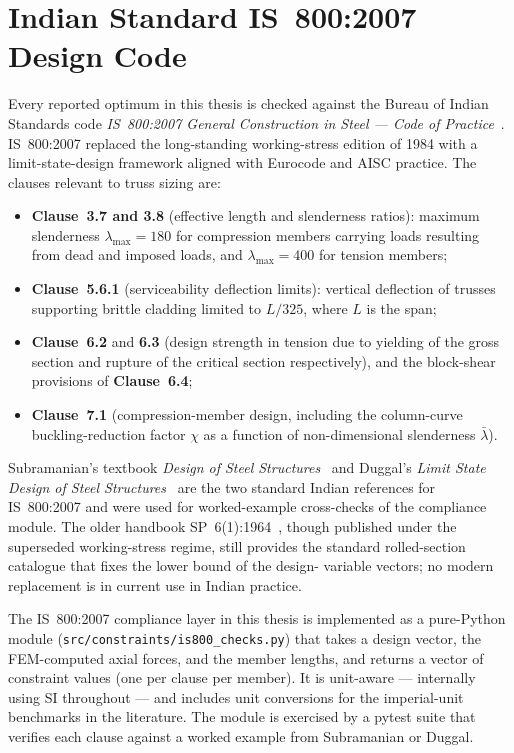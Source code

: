 \section{Indian Standard IS~800:2007 Design Code}
\label{sec:lit:is800}

Every reported optimum in this thesis is checked against the
Bureau of Indian Standards code \emph{IS~800:2007 General
Construction in Steel --- Code of Practice}~\cite{is800-2007}.
IS~800:2007 replaced the long-standing working-stress edition of
\num{1984} with a limit-state-design framework aligned with
Eurocode and AISC practice. The clauses relevant to truss sizing
are:
\begin{itemize}
  \item \textbf{Clause~3.7 and 3.8} (effective length and
        slenderness ratios): maximum slenderness
        $\lambda_{\max}=\num{180}$ for compression members carrying
        loads resulting from dead and imposed loads, and
        $\lambda_{\max}=\num{400}$ for tension members;
  \item \textbf{Clause~5.6.1} (serviceability deflection limits):
        vertical deflection of trusses supporting brittle cladding
        limited to $L/\num{325}$, where $L$ is the span;
  \item \textbf{Clause~6.2} and \textbf{6.3} (design strength in
        tension due to yielding of the gross section and rupture
        of the critical section respectively), and the
        block-shear provisions of \textbf{Clause~6.4};
  \item \textbf{Clause~7.1} (compression-member design, including
        the column-curve buckling-reduction factor $\chi$ as a
        function of non-dimensional slenderness
        $\bar{\lambda}$).
\end{itemize}

Subramanian's textbook \emph{Design of Steel
Structures}~\cite{subramanian2008} and Duggal's \emph{Limit State
Design of Steel Structures}~\cite{duggal2014} are the two standard
Indian references for IS~800:2007 and were used for worked-example
cross-checks of the compliance module. The older handbook
SP~6(1):1964~\cite{sp6-1-1964}, though published under the
superseded working-stress regime, still provides the standard
rolled-section catalogue that fixes the lower bound of the design-
variable vectors; no modern replacement is in current use in
Indian practice.

The IS~800:2007 compliance layer in this thesis is implemented as
a pure-Python module (\texttt{src/constraints/is800\_checks.py})
that takes a design vector, the FEM-computed axial forces, and the
member lengths, and returns a vector of constraint values (one per
clause per member). It is unit-aware --- internally using SI
throughout --- and includes unit conversions for the imperial-unit
benchmarks in the literature. The module is exercised by a pytest
suite that verifies each clause against a worked example from
Subramanian or Duggal.

